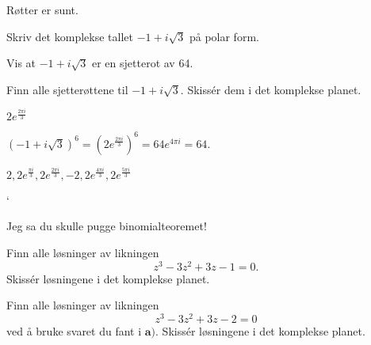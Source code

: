 \begin{oppgave}
Røtter er sunt.
\begin{punkt}
Skriv det komplekse tallet $-1+i\sqrt{3}$ på polar form.
\end{punkt}

\begin{punkt}
Vis at $-1+i\sqrt{3}$ er en sjetterot av 64.
\end{punkt}

\begin{punkt}
Finn alle sjetterøttene til $-1+i\sqrt{3}$. Skissér dem i det komplekse planet.
\end{punkt}

\end{oppgave}

\begin{losning}
\begin{punkt}
$2e^{\frac{2\pi i}{3}}$
\end{punkt}

\begin{punkt}
$(-1+i\sqrt{3})^6=(2e^{\frac{2\pi i}{3}})^6=64e^{4\pi i}=64.$
\end{punkt}

\begin{punkt}
$2,2e^{\frac{\pi i}{3}},2e^{\frac{2\pi i}{3}},-2,2e^{\frac{4\pi i}{3}},2e^{\frac{5\pi i}{3}}$


\begin{center}`
\end{center}


\end{punkt}

\end{losning}


\begin{oppgave}
Jeg sa du skulle pugge binomialteoremet!
\begin{punkt}
Finn alle løsninger av likningen $$z^3-3z^2+3z-1=0.$$ Skissér løsningene i det komplekse planet.
\end{punkt}
\begin{punkt}
Finn alle løsninger av likningen $$z^3-3z^2+3z-2=0$$ ved å bruke svaret du fant i $\textbf{a)}$. Skissér løsningene i det komplekse planet.
\end{punkt}
\end{oppgave}

